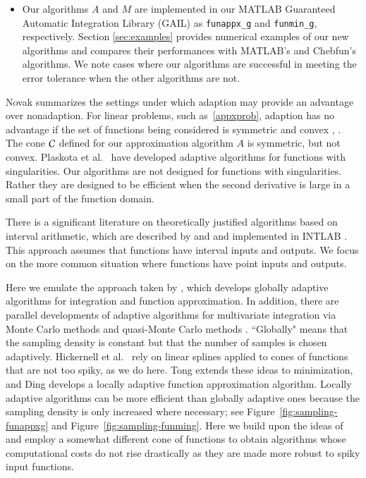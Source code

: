 \documentclass[review]{elsarticle}
\theoremstyle{definition}
\newcommand{\funappxg}{\texttt{funappx\_g}\xspace}
\newcommand{\funming}{\texttt{funmin\_g}\xspace}
\begin{document}
\begin{itemize}
\item Our algorithms $A$ and $M$ are implemented in our MATLAB Guaranteed
Automatic Integration Library (GAIL) \cite{ChoEtal15a} as \funappxg and
\funming, respectively. Section \ref{sec:examples} provides numerical examples
of our new algorithms and compares their performances with MATLAB's and
Chebfun's algorithms. We note cases where our algorithms are successful in
meeting the error tolerance when the other algorithms are not.

\end{itemize}

Novak \cite{Nov96a} summarizes the settings under which adaption may provide an
advantage over nonadaption. For linear problems, such as~\eqref{appxprob},
adaption has no advantage if the set of functions being considered is symmetric
and convex \cite[Theorem 1]{Nov96a}, \cite[Chapter 4, Theorem
5.2.1]{TraWasWoz88}. The cone $\mathcal{C}$ defined for our approximation algorithm $A$
is symmetric, but not convex. Plaskota et al.~\cite{PlaEtal08a} have developed
adaptive algorithms for functions with singularities. Our algorithms are not
designed for functions with singularities. Rather they are designed to be
efficient when the second derivative is large in a small part of the function
domain.

There is a significant literature on theoretically justified algorithms based on
interval arithmetic, which are described by \cite{MoKeCl09} and \cite{Rum10a}
and implemented in INTLAB \cite{Rum99a}. This approach assumes that functions
have interval inputs and outputs. We focus on the more common situation where
functions have point inputs and outputs.

Here we emulate the approach taken by \cite{HicEtal14b}, which develops globally
adaptive algorithms for integration and function approximation. In addition,
there are parallel developments of adaptive algorithms for multivariate
integration via Monte Carlo methods \citep{HicEtal14a, Jia16a} and quasi-Monte
Carlo methods \citep{HicJim16a,JimHic16a}. ``Globally" means that the sampling
density is constant but that the number of samples is chosen adaptively.
Hickernell et al.~\cite{HicEtal14b} rely on linear splines applied to cones of
functions that are not too spiky, as we do here. Tong \cite{Ton14a} extends
these ideas to minimization, and Ding \cite{Din15a} develops a locally adaptive
function approximation algorithm. Locally adaptive algorithms can be more
efficient than globally adaptive ones because the sampling density is only
increased where necessary; see Figure~\ref{fig:sampling-funappxg} and
Figure~\ref{fig:sampling-funming}. Here we build upon the ideas of \cite{Din15a}
and employ a somewhat different cone of functions to obtain algorithms whose
computational costs do not rise drastically as they are made more robust to
spiky input functions.
\end{document}
